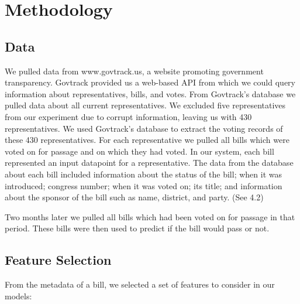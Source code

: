 \documentclass[11pt,letterpaper,twocolumn]{article}
\begin{document}
\section{Methodology}

\subsection{Data}

We pulled data from www.govtrack.us, a website promoting government transparency. Govtrack provided us a web-based API from which we could query information about representatives, bills, and votes. From Govtrack's database we pulled data about all current representatives. We excluded five representatives from our experiment due to corrupt information, leaving us with 430 representatives. We used Govtrack's database to extract the voting records of these 430 representatives. For each representative we pulled all bills which were voted on for passage and on which they had voted. In our system, each bill represented an input datapoint for a representative. The data from the database about each bill included information about the status of the bill; when it was introduced; congress number; when it was voted on; its title; and information about the sponsor of the bill such as name, district, and party. (See 4.2)

Two months later we pulled all bills which had been voted on for passage in that period. These bills were then used to predict if the bill would pass or not.

\subsection{Feature Selection}
From the metadata of a bill, we selected a set of features to consider in our models:\\
\end{document}
